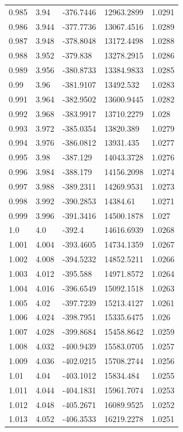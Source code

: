 \begin{tabular}{lllll}
0.985 & 3.94 & -376.7446 & 12963.2899 & 1.0291 \\
0.986 & 3.944 & -377.7736 & 13067.4516 & 1.0289 \\
0.987 & 3.948 & -378.8048 & 13172.4498 & 1.0288 \\
0.988 & 3.952 & -379.838 & 13278.2915 & 1.0286 \\
0.989 & 3.956 & -380.8733 & 13384.9833 & 1.0285 \\
0.99 & 3.96 & -381.9107 & 13492.532 & 1.0283 \\
0.991 & 3.964 & -382.9502 & 13600.9445 & 1.0282 \\
0.992 & 3.968 & -383.9917 & 13710.2279 & 1.028 \\
0.993 & 3.972 & -385.0354 & 13820.389 & 1.0279 \\
0.994 & 3.976 & -386.0812 & 13931.435 & 1.0277 \\
0.995 & 3.98 & -387.129 & 14043.3728 & 1.0276 \\
0.996 & 3.984 & -388.179 & 14156.2098 & 1.0274 \\
0.997 & 3.988 & -389.2311 & 14269.9531 & 1.0273 \\
0.998 & 3.992 & -390.2853 & 14384.61 & 1.0271 \\
0.999 & 3.996 & -391.3416 & 14500.1878 & 1.027 \\
1.0 & 4.0 & -392.4 & 14616.6939 & 1.0268 \\
1.001 & 4.004 & -393.4605 & 14734.1359 & 1.0267 \\
1.002 & 4.008 & -394.5232 & 14852.5211 & 1.0266 \\
1.003 & 4.012 & -395.588 & 14971.8572 & 1.0264 \\
1.004 & 4.016 & -396.6549 & 15092.1518 & 1.0263 \\
1.005 & 4.02 & -397.7239 & 15213.4127 & 1.0261 \\
1.006 & 4.024 & -398.7951 & 15335.6475 & 1.026 \\
1.007 & 4.028 & -399.8684 & 15458.8642 & 1.0259 \\
1.008 & 4.032 & -400.9439 & 15583.0705 & 1.0257 \\
1.009 & 4.036 & -402.0215 & 15708.2744 & 1.0256 \\
1.01 & 4.04 & -403.1012 & 15834.484 & 1.0255 \\
1.011 & 4.044 & -404.1831 & 15961.7074 & 1.0253 \\
1.012 & 4.048 & -405.2671 & 16089.9525 & 1.0252 \\
1.013 & 4.052 & -406.3533 & 16219.2278 & 1.0251 \\

\end{tabular}
